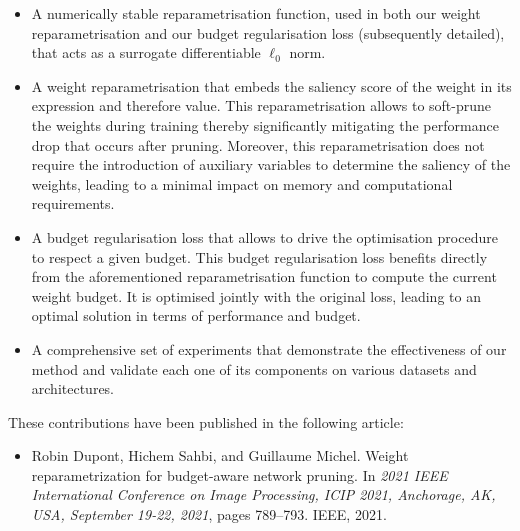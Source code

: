 \begin{itemize}
      \item A numerically stable reparametrisation function, used in both our
            weight reparametrisation and our budget regularisation loss
            (subsequently detailed), that acts as a surrogate differentiable
            $\ell_0$ norm.

      \item A weight reparametrisation that embeds the saliency score of the
            weight in its expression and therefore value. This reparametrisation
            allows to soft-prune the weights during training thereby significantly
            mitigating the performance drop that occurs after pruning. Moreover,
            this reparametrisation does not require the introduction of auxiliary
            variables to determine the saliency of the weights, leading to a
            minimal impact on memory and computational requirements.

      \item A budget regularisation loss that allows to drive the optimisation
            procedure to respect a given budget. This budget regularisation loss
            benefits directly from the aforementioned reparametrisation function
            to compute the current weight budget. It is optimised jointly with
            the original loss, leading to an optimal solution in terms of
            performance and budget.

      \item A comprehensive set of experiments that demonstrate the
            effectiveness of our method and validate each one of its components
            on various datasets and architectures.\\
\end{itemize}

\noindent These contributions have been published in the following article:
\begin{itemize}
      \item Robin Dupont, Hichem Sahbi, and Guillaume Michel. Weight
            reparametrization for budget-aware network pruning. In \emph{2021
            IEEE International Conference on Image Processing, ICIP 2021,
            Anchorage, AK, USA, September 19-22, 2021}, pages 789–793. IEEE,
            2021.\\
\end{itemize}



